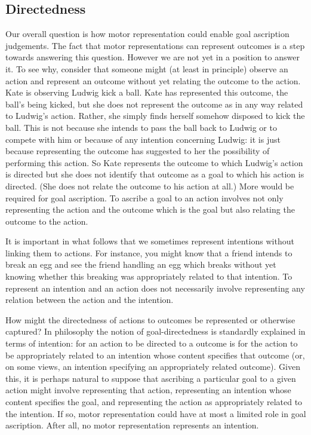 \documentclass[12pt,\papersize]{extarticle}
\begin{document}
\subsection{Directedness}
Our overall question is how motor representation could enable goal ascription judgements. The fact that motor representations can represent outcomes is a step towards answering this question. However we are not yet in a position to answer it. To see why, consider that someone might (at least in principle) observe an action and represent an outcome without yet relating the outcome to the action. Kate is observing Ludwig kick a ball. Kate has represented this outcome, the ball's being kicked, but she does not represent the outcome as in any way related to Ludwig's action. Rather, she simply finds herself somehow disposed to kick the ball. This is not because she intends to pass the ball back to Ludwig or to compete with him or because of any intention concerning Ludwig: it is just because representing the outcome has suggested to her the possibility of performing this action. So Kate represents the outcome to which Ludwig's action is directed but she does not identify that outcome as a goal to which his action is directed. (She does not relate the outcome to his action at all.)  More would be required for goal ascription. To ascribe a goal to an action involves not only representing the action and the outcome which is the goal but also relating the outcome to the action.

It is important in what follows that we sometimes represent intentions without linking them to actions.  For instance, you might know that a friend intends to break an egg and see the friend handling an egg which breaks without yet knowing whether this breaking was appropriately related to that intention.  To represent an intention and an action does not necessarily involve representing any relation between the action and the intention.

How might the directedness of actions to outcomes be represented or otherwise captured? In philosophy the notion of goal-directedness is standardly explained in terms of intention: for an action to be directed to a outcome is for the action to be appropriately related to an intention whose content specifies that outcome (or, on some views, an intention specifying an appropriately related outcome). Given this, it is perhaps natural to suppose that ascribing a particular goal to a given action might involve representing that action, representing an intention whose content specifies the goal, and representing the action as appropriately related to the intention.  If so, motor representation could have at most a limited role in goal ascription.  After all, no motor representation represents an intention.
\end{document}

